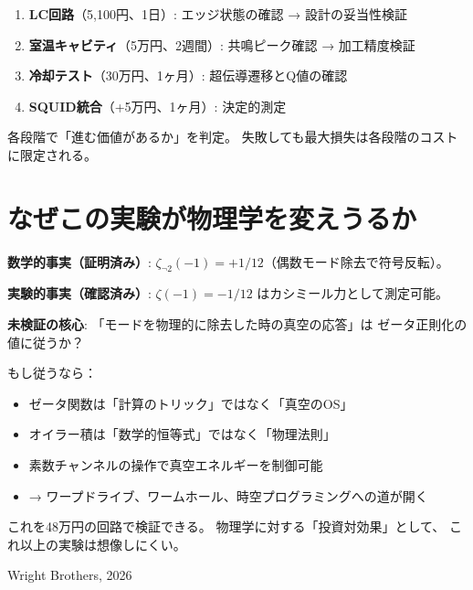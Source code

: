 \documentclass[12pt,a4paper]{article}
\begin{document}
\begin{enumerate}
\item \textbf{LC回路}（5,100円、1日）: エッジ状態の確認 → 設計の妥当性検証
\item \textbf{室温キャビティ}（5万円、2週間）: 共鳴ピーク確認 → 加工精度検証
\item \textbf{冷却テスト}（30万円、1ヶ月）: 超伝導遷移とQ値の確認
\item \textbf{SQUID統合}（+5万円、1ヶ月）: 決定的測定
\end{enumerate}

各段階で「進む価値があるか」を判定。
失敗しても最大損失は各段階のコストに限定される。

\section{なぜこの実験が物理学を変えうるか}

\begin{deepbox}[最終まとめ]
\textbf{数学的事実（証明済み）}:
$\zeta_{\neg 2}(-1) = +1/12$（偶数モード除去で符号反転）。

\textbf{実験的事実（確認済み）}:
$\zeta(-1) = -1/12$ はカシミール力として測定可能。

\textbf{未検証の核心}:
「モードを物理的に除去した時の真空の応答」は
ゼータ正則化の値に従うか？

もし従うなら：
\begin{itemize}
\item ゼータ関数は「計算のトリック」ではなく「真空のOS」
\item オイラー積は「数学的恒等式」ではなく「物理法則」
\item 素数チャンネルの操作で真空エネルギーを制御可能
\item → ワープドライブ、ワームホール、時空プログラミングへの道が開く
\end{itemize}

これを48万円の回路で検証できる。
物理学に対する「投資対効果」として、
これ以上の実験は想像しにくい。
\end{deepbox}

\vfill
\begin{center}
{\small Wright Brothers, 2026}
\end{center}
\end{document}
